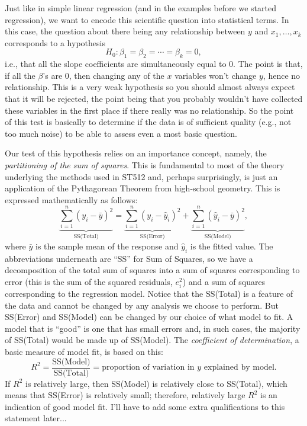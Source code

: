 \documentclass[a4paper, 12pt]{article}
\theoremstyle{plain}
\theoremstyle{definition}
\theoremstyle{remark}
\begin{document}
Just like in simple linear regression (and in the examples before we started regression), we want to encode this scientific question into statistical terms.  In this case, the question about there being any relationship between $y$ and $x_1,\ldots,x_k$ corresponds to a hypothesis
\[ H_0: \beta_1 = \beta_2 = \cdots = \beta_k = 0, \]
i.e., that all the slope coefficients are simultaneously equal to 0.  The point is that, if all the $\beta$'s are 0, then changing any of the $x$ variables won't change $y$, hence no relationship.  This is a very weak hypothesis so you should almost always expect that it will be rejected, the point being that you probably wouldn't have collected these variables in the first place if there really was no relationship.  So the point of this test is basically to determine if the data is of sufficient quality (e.g., not too much noise) to be able to assess even a most basic question.  

Our test of this hypothesis relies on an importance concept, namely, the {\em partitioning of the sum of squares}.  This is fundamental to most of the theory underlying the methods used in ST512 and, perhaps surprisingly, is just an application of the Pythagorean Theorem from high-school geometry.  This is expressed mathematically as follows:
\[ \underbrace{\sum_{i=1}^n (y_i - \bar y)^2}_{\text{SS(Total)}} = \underbrace{\sum_{i=1}^n (y_i - \hat y_i)^2}_{\text{SS(Error)}} + \underbrace{\sum_{i=1}^n (\hat y_i - \bar y)^2}_{\text{SS(Model)}}, \]
where $\bar y$ is the sample mean of the response and $\hat y_i$ is the fitted value.  The abbreviations underneath are ``SS'' for Sum of Squares, so we have a decomposition of the total sum of squares into a sum of squares corresponding to error (this is the sum of the squared residuals, $e_i^2$) and a sum of squares corresponding to the regression model.  Notice that the SS(Total) is a feature of the data and cannot be changed by any analysis we choose to perform.  But SS(Error) and SS(Model) can be changed by our choice of what model to fit.  A model that is ``good'' is one that has small errors and, in such cases, the majority of SS(Total) would be made up of SS(Model).  The {\em coefficient of determination}, a basic measure of model fit, is based on this:
\[ R^2 = \frac{\text{SS(Model)}}{\text{SS(Total)}} = \text{proportion of variation in $y$ explained by model}. \]
If $R^2$ is relatively large, then SS(Model) is relatively close to SS(Total), which means that SS(Error) is relatively small; therefore, relatively large $R^2$ is an indication of good model fit.  I'll have to add some extra qualifications to this statement later...
\end{document}
